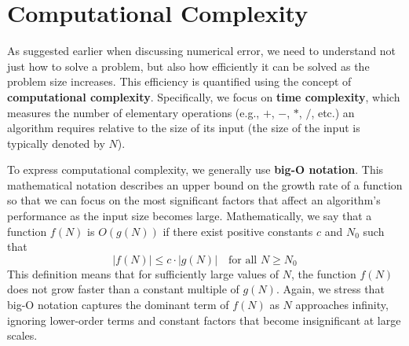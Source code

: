 \section{Computational Complexity}
As suggested earlier when discussing numerical error, we need to understand not just how to solve a problem, but also how efficiently it can be solved as the problem size increases. This efficiency is quantified using the concept of \textbf{computational complexity}. Specifically, we focus on \textbf{time complexity}, which measures the number of elementary operations (e.g., $+$, $-$, $*$, $/$, etc.) an algorithm requires relative to the size of its input (the size of the input is typically denoted by $N$).

To express computational complexity, we generally use \textbf{big-O notation}. This mathematical notation describes an upper bound on the growth rate of a function so that we can focus on the most significant factors that affect an algorithm's performance as the input size becomes large. Mathematically, we say that a function $f(N)$ is $O(g(N))$ if there exist positive constants $c$ and $N_0$ such that
\begin{equation*}
    \left|f(N)\right| \leq c \cdot \left|g(N)\right| \quad \text{for all } N \geq N_0
\end{equation*}
This definition means that for sufficiently large values of $N$, the function $f(N)$ does not grow faster than a constant multiple of $g(N)$. Again, we stress that big-O notation captures the dominant term of $f(N)$ as $N$ approaches infinity, ignoring lower-order terms and constant factors that become insignificant at large scales.


